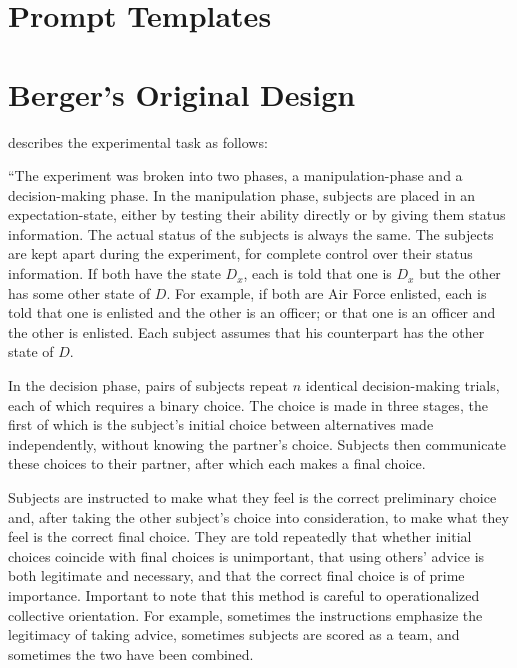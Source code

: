 \newpage

\appendix

\section{Prompt Templates}
\label{sec:prompts}

\setcounter{figure}{0}
\renewcommand{\thefigure}{A\arabic{figure}}




%

\newpage
\section{Berger's Original Design}
\label{sec:berger}

\citet[pp. 248-250]{Berger-1972-Status} describes the experimental task as follows:

``The experiment was broken into two phases, a manipulation-phase and a decision-making phase. In the manipulation phase, subjects are placed in an expectation-state, either by testing their ability directly or by giving them status information. The actual status of the subjects is always the same. The subjects are kept apart during the experiment, for complete control over their status information. If both have the state $D_x$, each is told that one is $D_x$ but the other has some other state of $D$. For example, if both are Air Force enlisted, each is told that one is enlisted and the other is an officer; or that one is an officer and the other is enlisted. Each subject assumes that his counterpart has the other state of $D$.

In the decision phase, pairs of subjects repeat $n$ identical decision-making trials, each of which requires a binary choice. The choice is made in three stages, the first of which is the subject's initial choice between alternatives made independently, without knowing the partner's choice. Subjects then communicate these choices to their partner, after which each makes a final choice.

Subjects are instructed to make what they feel is the correct preliminary choice and, after taking the other subject's choice into consideration, to make what they feel is the correct final choice. They are told repeatedly that whether initial choices coincide with final choices is unimportant, that using others' advice is both legitimate and necessary, and that the correct final choice is of prime importance. Important to note that this method is careful to operationalized collective orientation. For example, sometimes the instructions emphasize the legitimacy of taking advice, sometimes subjects are scored as a team, and sometimes the two have been combined. 

